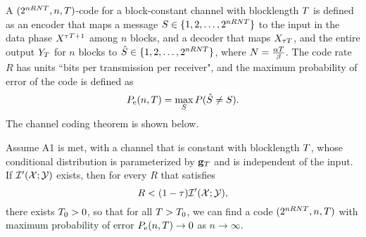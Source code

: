 \documentclass[12pt, draftclsnofoot,journal,onecolumn]{IEEEtran}
\begin{document}
A $(2^{nRNT },n,T)$-code for a block-constant channel with blocklength $T$ is defined as an encoder that maps a message $S\in\{1,2,\ldots,2^{nRNT}\}$ to the input in the data phase $X^{{\tau T}+1}$ among $n$ blocks,
and a decoder that maps $X_{{\tau T}}$, and the entire output $Y_{T}$ for $n$ blocks to $\hat{S}\in\{1,2,\ldots,2^{nRNT}\}$, where $N = \frac{\alpha T}{\beta}$. The code rate $R$ has units ``bits per transmission per receiver", and the maximum probability of error of the code is defined as
\begin{equation}
    P_{\rm e}(n,T)=\max_{S}{P}(\hat{S}\neq S).
    \label{eq:max_prob_err}
\end{equation}
The channel coding theorem is shown below.
\begin{thm}
\label{thm:channel_coding_thm_inf_Tb}
Assume A1 is met, with a channel that is constant with blocklength $T$, whose conditional distribution is parameterized by ${\mathbf{g}}_{T}$ and is independent of the input.  If $\mathcal{I}{'}({\mathcal{X}};{\mathcal{Y}}{})$ exists, then for every $R$ that satisfies
\begin{equation*}
    R<(1-\tau)\mathcal{I}{'}({\mathcal{X}};{\mathcal{Y}}{}),
\end{equation*}
there exists $T_0>0$, so that for all $T>T_0$, we can find a code $(2^{nRNT },n,T)$ with maximum probability of error $P_{\rm e}(n,T)\to 0$ as $n\to\infty$.
\end{thm}
\end{document}
